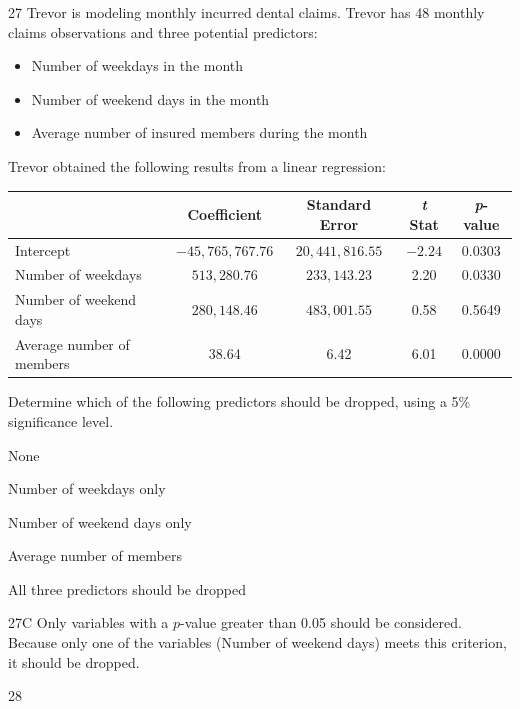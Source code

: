 \begin{question}{27}
Trevor is modeling monthly incurred dental claims. Trevor has 48 monthly claims observations and three potential predictors:
\begin{itemize}
\item Number of weekdays in the month
\item Number of weekend days in the month
\item Average number of insured members during the month
\end{itemize}
Trevor obtained the following results from a linear regression:
\begin{center}
\begin{tabular}{|l|c|c|c|c|}
\hline
 & \textbf{Coefficient} & \textbf{Standard Error} & \textbf{\textit{t} Stat} & \textbf{\textit{p}-value} \\ \hline
Intercept & $-45{,}765{,}767.76$ & $20{,}441{,}816.55$ & $-2.24$ & 0.0303 \\ \hline
Number of weekdays & $513{,}280.76$ & $233{,}143.23$ & 2.20 & 0.0330 \\ \hline
Number of weekend days & $280{,}148.46$ & $483{,}001.55$ & 0.58 & 0.5649 \\ \hline
Average number of members & 38.64 & 6.42 & 6.01 & 0.0000 \\ \hline
\end{tabular}
\end{center}

Determine which of the following predictors should be dropped, using a 5\% significance level.

\begin{choices}
\item None
\item Number of weekdays only
\item Number of weekend days only
\item Average number of members
\item All three predictors should be dropped
\end{choices}
\end{question}
\begin{solution}{27}{C}
Only variables with a $p$-value greater than 0.05 should be considered. Because only one of the variables (Number of weekend days) meets this criterion, it should be dropped.
\end{solution}

\begin{question}{28}
\deleted
\end{question}

